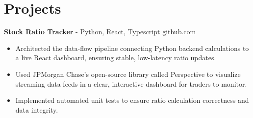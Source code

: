 \documentclass[11pt]{article}       %
\begin{document}

\vspace{-18.5pt}

\section*{Projects}

\textbf{Stock Ratio Tracker}{ - Python, React, Typescript} \hfill \href{https://github.com/Monica20030707/Trading-Dashboard_UI}{github.com} \\
\vspace{-9pt}
\begin{itemize}
  \item Architected the data-flow pipeline connecting Python backend calculations to a live React dashboard, ensuring stable, low-latency ratio updates. 
  \item Used JPMorgan Chase’s open-source library called Perspective to visualize streaming data feeds in a clear, interactive dashboard for traders to monitor.
  \item Implemented automated unit tests to ensure ratio calculation correctness and data integrity.
\end{itemize}

\end{document}
